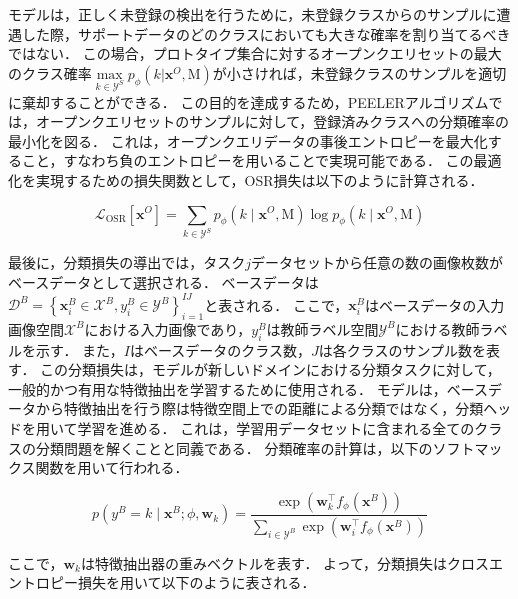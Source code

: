モデルは，正しく未登録の検出を行うために，未登録クラスからのサンプルに遭遇した際，サポートデータのどのクラスにおいても大きな確率を割り当てるべきではない．
この場合，プロトタイプ集合に対するオープンクエリセットの最大のクラス確率$\underset{k \in \mathcal{Y}^S}{\max} {p_{\phi}(k|\bm{x}^O, \mathrm{M})}$が小さければ，未登録クラスのサンプルを適切に棄却することができる．
この目的を達成するため，PEELERアルゴリズムでは，オープンクエリセットのサンプルに対して，登録済みクラスへの分類確率の最小化を図る．
これは，オープンクエリデータの事後エントロピーを最大化すること，すなわち負のエントロピーを用いることで実現可能である．
この最適化を実現するための損失関数として，OSR損失は以下のように計算される．

\begin{equation}
    \mathcal{L}_{\mathrm{OSR}}[\bm{x}^O]
                = \sum_{k \in \mathcal{Y}^S} {p_{\phi}(k \mid \bm{x}^O, \mathrm{M}) \log{p_{\phi}(k \mid \bm{x}^O, \mathrm{M})}}
\end{equation}

最後に，分類損失の導出では，タスク$j$データセットから任意の数の画像枚数がベースデータとして選択される．
ベースデータは$\mathcal{D}^B = \left\{ \bm{x}^B_i \in \mathcal{X}^B, y^B_i \in \mathcal{Y}^B \right\}^{I J}_{i=1}$と表される．
ここで，$\bm{x}^B_i$はベースデータの入力画像空間$\mathcal{X}^B$における入力画像であり，$y^B_i$は教師ラベル空間$\mathcal{Y}^B$における教師ラベルを示す．
また，$I$はベースデータのクラス数，$J$は各クラスのサンプル数を表す．
この分類損失は，モデルが新しいドメインにおける分類タスクに対して，一般的かつ有用な特徴抽出を学習するために使用される．
モデルは，ベースデータから特徴抽出を行う際は特徴空間上での距離による分類ではなく，分類ヘッドを用いて学習を進める．
これは，学習用データセットに含まれる全てのクラスの分類問題を解くことと同義である．
分類確率の計算は，以下のソフトマックス関数を用いて行われる．

\begin{equation}
    p(y^B=k \mid \bm{x}^B;\phi,\mathbf{w}_k) 
        = \frac{\exp(\mathbf{w}_k^{\top} f_{\phi}(\bm{x}^B))}{\sum_{i \in \mathcal{Y}^B} \exp(\mathbf{w}_{i}^{\top} f_{\phi}(\bm{x}^B))}
\end{equation}

\noindent
ここで，$\mathbf{w}_k$は特徴抽出器の重みベクトルを表す．
よって，分類損失はクロスエントロピー損失を用いて以下のように表される．

